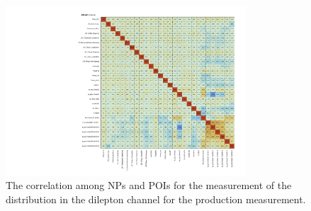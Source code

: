 \begin{figure}[ht]
  \centering
  \includegraphics[width=0.8\textwidth]{figures/diff_xsec/dilep_tty_prod_mu_blinded/correlations/tty2l_pt_all_syst/CorrMatrix.pdf}
  \caption{The correlation among NPs and POIs for the measurement of the \ptgamma distribution in the dilepton channel for the \tty production measurement.}
  \label{fig:NP_corr_dilep_mu_blinded}
\end{figure}
\FloatBarrier


